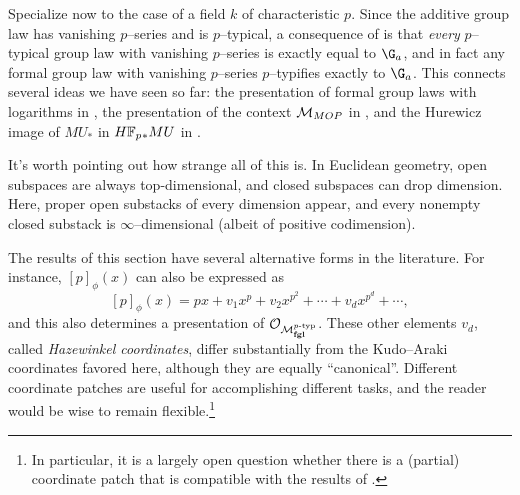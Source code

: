 \begin{remark}
Specialize now to the case of a field $k$ of characteristic $p$.  Since the additive group law has vanishing $p$--series and is $p$--typical, a consequence of  is that \emph{every} $p$--typical group law with vanishing $p$--series is exactly equal to $\G_a$, and in fact any formal group law with vanishing $p$--series $p$--typifies exactly to $\G_a$.  This connects several ideas we have seen so far: the presentation of formal group laws with logarithms in , the presentation of the context $\mathcal{M}_{MOP}$ in , and the Hurewicz image of $MU_*$ in $\HFp_* MU$ in .
\end{remark}

\begin{remark}
It's worth pointing out how strange all of this is. In Euclidean geometry, open subspaces are always top-dimensional, and closed subspaces can drop dimension.  Here, proper open substacks of every dimension appear, and every nonempty closed substack is $\infty$--dimensional (albeit of positive codimension).
\end{remark}

\begin{remark}
The results of this section have several alternative forms in the literature.  For instance, $[p]_\phi(x)$ can also be expressed as \[[p]_\phi(x) = px + v_1 x^p + v_2 x^{p^2} + \cdots + v_d x^{p^d} + \cdots,\] and this also determines a presentation of $\mathcal{O}_{\mathcal{M}_{\mathbf{fgl}}^{p\text{-}\mathrm{typ}}}$.  These other elements $v_d$, called \textit{Hazewinkel coordinates}, differ substantially from the Kudo--Araki coordinates favored here, although they are equally ``canonical''.  Different coordinate patches are useful for accomplishing different tasks, and the reader would be wise to remain flexible.\footnote{In particular, it is a largely open question whether there is a (partial) coordinate patch that is compatible with the results of .}
\end{remark}

